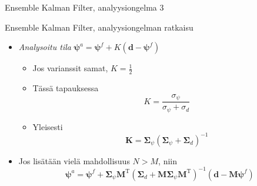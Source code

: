 \documentclass{beamer}
\begin{document}
\begin{frame}{Ensemble Kalman Filter, analyysiongelma 3}

\begin{figure}
\end{figure}

\end{frame}




\begin{frame}{Ensemble Kalman Filter, analyysiongelman ratkaisu}

\begin{itemize}
\item \emph{Analysoitu tila} $\boldsymbol{\psi}^a = \boldsymbol{\psi}^f + K\left(\boldsymbol{d}-\boldsymbol{\psi}^f\right)$
\begin{itemize}
\item Jos varianssit samat, $K = \frac{1}{2}$
\item Tässä tapauksessa \[ K = \frac{\sigma_\psi}{\sigma_\psi+\sigma_d} \]
\item Yleisesti \[ \mathbf{K} = \boldsymbol{\Sigma}_\psi\left(\boldsymbol{\Sigma}_\psi+\boldsymbol{\Sigma}_d\right)^{-1} \]
\end{itemize}
\item \pause Jos lisätään vielä mahdollisuus $N > M$, niin 
\[
\boldsymbol{\psi}^a = \boldsymbol{\psi}^f + \boldsymbol{\Sigma}_\psi \mathbf{M}^\mathrm{T} \left(\boldsymbol{\Sigma}_d+\mathbf{M}\boldsymbol{\Sigma}_\psi\mathbf{M}^\mathrm{T}\right)^{-1}\left(\boldsymbol{d}-\mathbf{M}\boldsymbol{\psi}^f\right)
\]
\end{itemize}

\end{frame}
\end{document}
